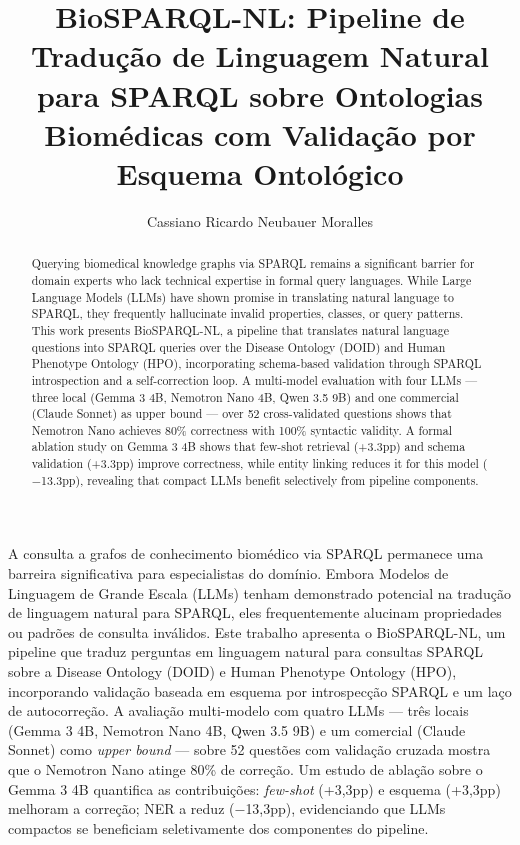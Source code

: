 \documentclass[12pt]{article}
\title{BioSPARQL-NL: Pipeline de Tradu\c{c}\~{a}o de Linguagem Natural para SPARQL sobre Ontologias Biom\'{e}dicas com Valida\c{c}\~{a}o por Esquema Ontol\'{o}gico}
\author{Cassiano Ricardo Neubauer Moralles\inst{1}}
\begin{document}
\maketitle

\begin{abstract}
Querying biomedical knowledge graphs via SPARQL remains a significant barrier for domain experts who lack technical expertise in formal query languages. While Large Language Models (LLMs) have shown promise in translating natural language to SPARQL, they frequently hallucinate invalid properties, classes, or query patterns. This work presents BioSPARQL-NL, a pipeline that translates natural language questions into SPARQL queries over the Disease Ontology (DOID) and Human Phenotype Ontology (HPO), incorporating schema-based validation through SPARQL introspection and a self-correction loop. A multi-model evaluation with four LLMs --- three local (Gemma 3 4B, Nemotron Nano 4B, Qwen 3.5 9B) and one commercial (Claude Sonnet) as upper bound --- over 52 cross-validated questions shows that Nemotron Nano achieves 80\% correctness with 100\% syntactic validity. A formal ablation study on Gemma 3 4B shows that few-shot retrieval (+3.3pp) and schema validation (+3.3pp) improve correctness, while entity linking reduces it for this model ($-$13.3pp), revealing that compact LLMs benefit selectively from pipeline components.
\end{abstract}

\begin{resumo}
A consulta a grafos de conhecimento biom\'{e}dico via SPARQL permanece uma barreira significativa para especialistas do dom\'{i}nio. Embora Modelos de Linguagem de Grande Escala (LLMs) tenham demonstrado potencial na tradu\c{c}\~{a}o de linguagem natural para SPARQL, eles frequentemente alucinam propriedades ou padr\~{o}es de consulta inv\'{a}lidos. Este trabalho apresenta o BioSPARQL-NL, um pipeline que traduz perguntas em linguagem natural para consultas SPARQL sobre a Disease Ontology (DOID) e Human Phenotype Ontology (HPO), incorporando valida\c{c}\~{a}o baseada em esquema por introspec\c{c}\~{a}o SPARQL e um la\c{c}o de autocorre\c{c}\~{a}o. A avalia\c{c}\~{a}o multi-modelo com quatro LLMs --- tr\^{e}s locais (Gemma 3 4B, Nemotron Nano 4B, Qwen 3.5 9B) e um comercial (Claude Sonnet) como \textit{upper bound} --- sobre 52 quest\~{o}es com valida\c{c}\~{a}o cruzada mostra que o Nemotron Nano atinge 80\% de corre\c{c}\~{a}o. Um estudo de abla\c{c}\~{a}o sobre o Gemma 3 4B quantifica as contribui\c{c}\~{o}es: \textit{few-shot} (+3,3pp) e esquema (+3,3pp) melhoram a corre\c{c}\~{a}o; NER a reduz ($-$13,3pp), evidenciando que LLMs compactos se beneficiam seletivamente dos componentes do pipeline.
\end{resumo}
\end{document}
